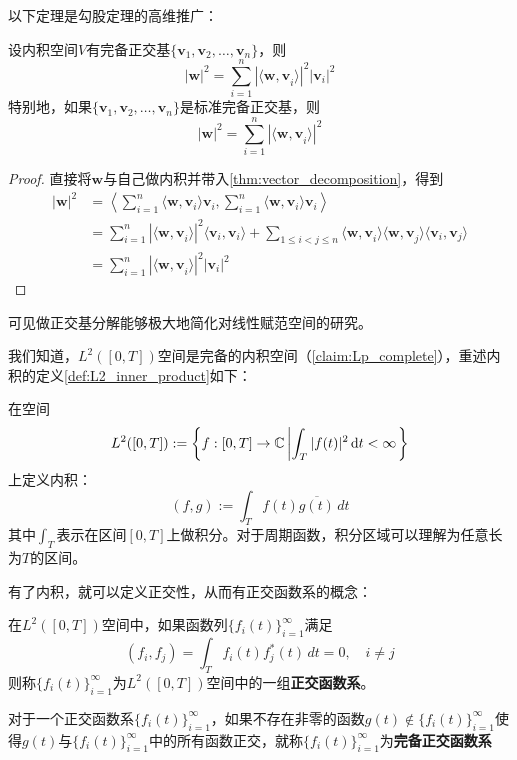 以下定理是勾股定理的高维推广：
\begin{theorem}[毕达哥拉斯定理]\label{thm:gougu}
    设内积空间$V$有完备正交基$\{\mathbf{v}_1,\mathbf{v}_2,\dots ,\mathbf{v}_n\}$，则
    \[|\mathbf{w}|^2=\sum_{i=1}^{n}|\langle\mathbf{w,v}_i\rangle|^2|\mathbf{v}_i|^2\]
    特别地，如果$\{\mathbf{v}_1,\mathbf{v}_2,\dots ,\mathbf{v}_n\}$是标准完备正交基，则
    $$|\mathbf{w}|^2=\sum_{i=1}^{n}|\langle\mathbf{w,v}_i\rangle|^2$$
\end{theorem}
\begin{proof}
    直接将$\mathbf{w}$与自己做内积并带入\cref{thm:vector_decomposition}，得到
    \begin{align*}
        |\mathbf{w}|^2 & =\left\langle \sum_{i=1}^{n}\langle \mathbf{w},\mathbf{v}_i\rangle \mathbf{v}_i,\sum_{i=1}^{n}\langle \mathbf{w},\mathbf{v}_i\rangle \mathbf{v}_i\right\rangle                                                  \\
                       & =\sum_{i=1}^{n}|\langle\mathbf{w,v}_i\rangle|^2\langle\mathbf{v}_i,\mathbf{v}_i\rangle+\sum_{1\leq i<j\leq n}\langle \mathbf{w,v}_i\rangle\langle \mathbf{w,v}_j\rangle\langle \mathbf{v}_i,\mathbf{v}_j\rangle \\
                       & =\sum_{i=1}^{n}|\langle\mathbf{w,v}_i\rangle|^2|\mathbf{v}_i|^2
    \end{align*}
\end{proof}
可见做正交基分解能够极大地简化对线性赋范空间的研究。

我们知道，$L^2([0,T])$空间是完备的内积空间（\cref{claim:Lp_complete}），重述内积的定义\cref{def:L2_inner_product}如下：
\begin{definition}[函数空间上的内积]
    在空间\[L^2([0,T]):=\left\{f:[0,T]\rightarrow \mathbb{C} \left| \int_{T}|f(t)|^2\,\text dt<\infty\right.\right\}\]
    上定义内积：
    \[(f,g):=\int_{T}f(t)\overline{g(t)}\,dt \]
    其中$\int_T$表示在区间$[0,T]$上做积分。对于周期函数，积分区域可以理解为任意长为$T$的区间。
\end{definition}

有了内积，就可以定义正交性，从而有正交函数系的概念：
\begin{definition}[正交函数系]
    在$L^2([0,T])$空间中，如果函数列$\{f_i(t)\}_{i=1}^{\infty}$满足
    \[(f_i,f_j)=\int_{T}f_i(t)f_j^*(t)\,dt=0,\quad i\neq j\]
    则称$\{f_i(t)\}_{i=1}^{\infty}$为$L^2([0,T])$空间中的一组\textbf{正交函数系}。
\end{definition}

\begin{definition}[完备正交函数系]
    对于一个正交函数系$\{f_i(t)\}_{i=1}^{\infty}$，如果不存在非零的函数$g(t)\notin\{f_i(t)\}_{i=1}^{\infty}$使得$g(t)$与$\{f_i(t)\}_{i=1}^{\infty}$中的所有函数正交，就称$\{f_i(t)\}_{i=1}^{\infty}$为\textbf{完备正交函数系}
\end{definition}

